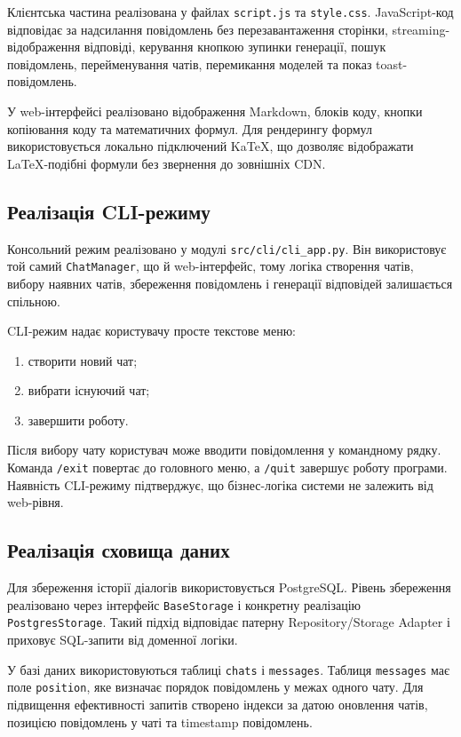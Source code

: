 Клієнтська частина реалізована у файлах \texttt{script.js} та \texttt{style.css}. JavaScript-код відповідає за надсилання повідомлень без перезавантаження сторінки, streaming-відображення відповіді, керування кнопкою зупинки генерації, пошук повідомлень, перейменування чатів, перемикання моделей та показ toast-повідомлень.

У web-інтерфейсі реалізовано відображення Markdown, блоків коду, кнопки копіювання коду та математичних формул. Для рендерингу формул використовується локально підключений KaTeX, що дозволяє відображати LaTeX-подібні формули без звернення до зовнішніх CDN.

\subsection{Реалізація CLI-режиму}

Консольний режим реалізовано у модулі \texttt{src/cli/cli\_app.py}. Він використовує той самий \texttt{ChatManager}, що й web-інтерфейс, тому логіка створення чатів, вибору наявних чатів, збереження повідомлень і генерації відповідей залишається спільною.

CLI-режим надає користувачу просте текстове меню:
\begin{enumerate}
  \item створити новий чат;
  \item вибрати існуючий чат;
  \item завершити роботу.
\end{enumerate}

Після вибору чату користувач може вводити повідомлення у командному рядку. Команда \texttt{/exit} повертає до головного меню, а \texttt{/quit} завершує роботу програми. Наявність CLI-режиму підтверджує, що бізнес-логіка системи не залежить від web-рівня.

\subsection{Реалізація сховища даних}

Для збереження історії діалогів використовується PostgreSQL. Рівень збереження реалізовано через інтерфейс \texttt{BaseStorage} і конкретну реалізацію \texttt{PostgresStorage}. Такий підхід відповідає патерну Repository/Storage Adapter і приховує SQL-запити від доменної логіки.

У базі даних використовуються таблиці \texttt{chats} і \texttt{messages}. Таблиця \texttt{messages} має поле \texttt{position}, яке визначає порядок повідомлень у межах одного чату. Для підвищення ефективності запитів створено індекси за датою оновлення чатів, позицією повідомлень у чаті та timestamp повідомлень.

